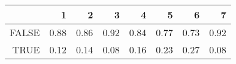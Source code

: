 \begin{table}[ht]
\centering
\begin{tabular}{rrrrrrrr}
  \hline
 & 1 & 2 & 3 & 4 & 5 & 6 & 7 \\ 
  \hline
FALSE & 0.88 & 0.86 & 0.92 & 0.84 & 0.77 & 0.73 & 0.92 \\ 
  TRUE & 0.12 & 0.14 & 0.08 & 0.16 & 0.23 & 0.27 & 0.08 \\ 
   \hline
\end{tabular}
\end{table}

